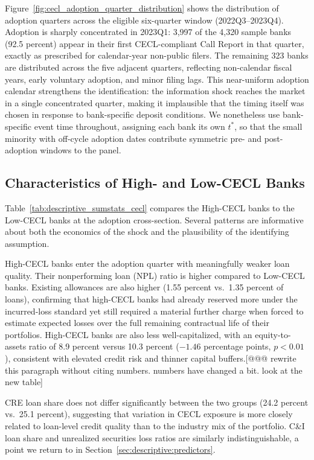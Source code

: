 Figure~\ref{fig:cecl_adoption_quarter_distribution} shows the distribution of
adoption quarters across the eligible six-quarter window (2022Q3--2023Q4).
Adoption is sharply concentrated in 2023Q1: 3,997 of the 4,320 sample banks
(92.5 percent) appear in their first CECL-compliant Call Report in that quarter,
exactly as prescribed for calendar-year non-public filers.  The remaining
323 banks are distributed across the five adjacent quarters, reflecting
non-calendar fiscal years, early voluntary adoption, and minor filing lags.
This near-uniform adoption calendar strengthens the identification: the
information shock reaches the market in a single concentrated quarter, making
it implausible that the timing itself was chosen in response to bank-specific
deposit conditions.  We nonetheless use bank-specific event time throughout,
assigning each bank its own $t^{*}$, so that the small minority with off-cycle
adoption dates contribute symmetric pre- and post-adoption windows to the panel.

\subsection{Characteristics of High- and Low-CECL Banks}
\label{sec:descriptive:balance}

Table~\ref{tab:descriptive_sumstats_cecl} compares the High-CECL banks
to the Low-CECL banks at the adoption cross-section.  Several patterns
are informative about both the economics of the shock and the plausibility of
the identifying assumption.

High-CECL banks enter the adoption quarter with meaningfully weaker loan quality.
Their nonperforming loan (NPL) ratio is higher compared to Low-CECL banks.  Existing allowances are also higher (1.55 percent vs.\
1.35 percent of loans), confirming that high-CECL banks had already reserved
more under the incurred-loss standard yet still required a material further charge
when forced to estimate expected losses over the full remaining contractual life
of their portfolios.  High-CECL banks are also less well-capitalized, with an
equity-to-assets ratio of 8.9 percent versus 10.3 percent ($-1.46$ percentage
points, $p < 0.01$), consistent with elevated credit risk and thinner capital
buffers.[@@@ rewrite this paragraph without citing numbers. numbers have changed a bit. look at the new table]

CRE loan share does not differ significantly between the two groups (24.2 percent
vs.\ 25.1 percent), suggesting that variation in CECL exposure is more closely
related to loan-level credit quality than to the industry mix of the portfolio.
C\&I loan share and unrealized securities loss ratios are similarly
indistinguishable, a point we return to in Section~\ref{sec:descriptive:predictors}.

